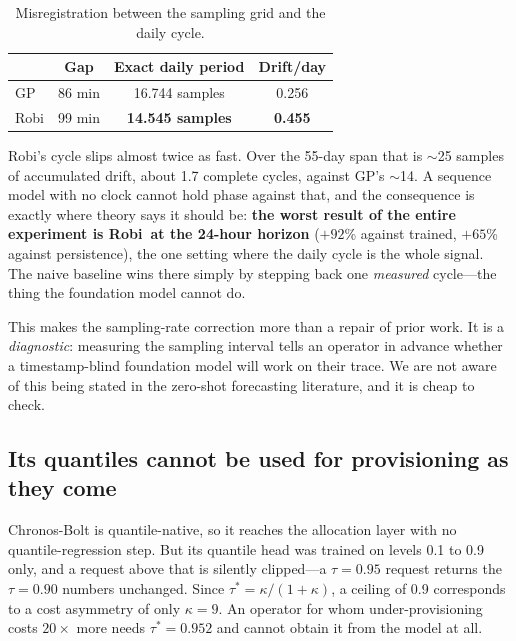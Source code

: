 \documentclass[conference]{IEEEtran}
\newcommand{\gpx}{GP}
\newcommand{\robix}{Robi}
\begin{document}
\begin{table}[htbp]
\caption{Misregistration between the sampling grid and the daily cycle.}
\label{tab:misreg}
\centering
\begin{tabular}{lccc}
\toprule
& \textbf{Gap} & \textbf{Exact daily period} & \textbf{Drift/day} \\
\midrule
\gpx & 86 min & 16.744 samples & 0.256 \\
\robix & 99 min & \textbf{14.545 samples} & \textbf{0.455} \\
\bottomrule
\end{tabular}
\end{table}

\robix's cycle slips almost twice as fast. Over the 55-day span that is $\sim$25
samples of accumulated drift, about 1.7 complete cycles, against \gpx's $\sim$14. A
sequence model with no clock cannot hold phase against that, and the consequence is
exactly where theory says it should be: \textbf{the worst result of the entire
experiment is \robix\ at the 24-hour horizon} ($+92$\% against trained, $+65$\% against
persistence), the one setting where the daily cycle is the whole signal. The naive
baseline wins there simply by stepping back one \emph{measured} cycle---the thing the
foundation model cannot do.

This makes the sampling-rate correction more than a repair of prior work. It is a
\emph{diagnostic}: measuring the sampling interval tells an operator in advance whether
a timestamp-blind foundation model will work on their trace. We are not aware of this
being stated in the zero-shot forecasting literature, and it is cheap to check.

\subsection{Its quantiles cannot be used for provisioning as they come}

Chronos-Bolt is quantile-native, so it reaches the allocation layer with no
quantile-regression step. But its quantile head was trained on levels 0.1 to 0.9 only,
and a request above that is silently clipped---a $\tau = 0.95$ request returns the
$\tau = 0.90$ numbers unchanged. Since $\tau^{*} = \kappa/(1+\kappa)$, a ceiling of 0.9
corresponds to a cost asymmetry of only $\kappa = 9$. An operator for whom
under-provisioning costs $20\times$ more needs $\tau^{*} = 0.952$ and cannot obtain it
from the model at all.
\end{document}
